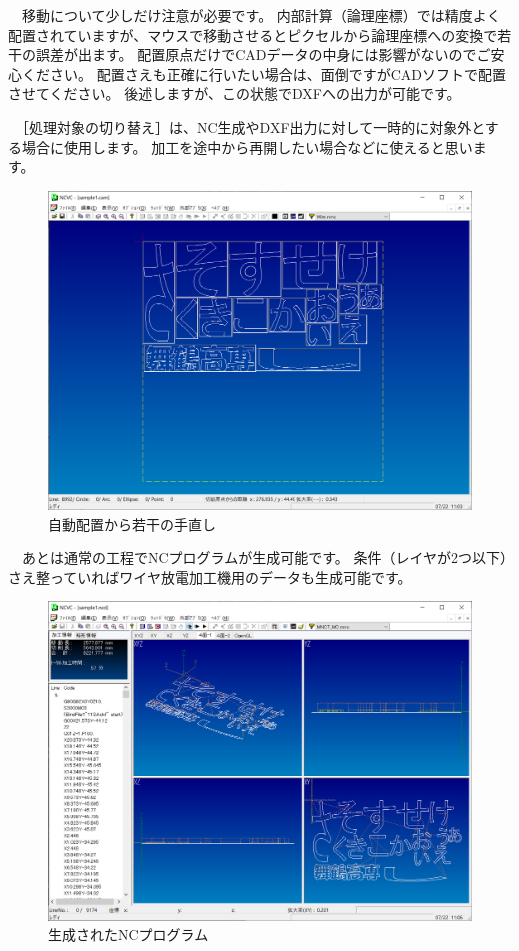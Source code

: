 　移動について少しだけ注意が必要です。
内部計算（論理座標）では精度よく配置されていますが、マウスで移動させるとピクセルから論理座標への変換で若干の誤差が出ます。
配置原点だけでCADデータの中身には影響がないのでご安心ください。
配置さえも正確に行いたい場合は、面倒ですがCADソフトで配置させてください。
後述しますが、この状態でDXFへの出力が可能です。

　［処理対象の切り替え］は、NC生成やDXF出力に対して一時的に対象外とする場合に使用します。
加工を途中から再開したい場合などに使えると思います。

\begin{figure}[H]
\centering
\includegraphics[scale=0.5]{No1/fig/sample2.png}
\caption{自動配置から若干の手直し}
\label{fig:sample2.png}
\end{figure}

　あとは通常の工程でNCプログラムが生成可能です。
条件（レイヤが2つ以下）さえ整っていればワイヤ放電加工機用のデータも生成可能です。

\begin{figure}[H]
\centering
\includegraphics[scale=0.5]{No1/fig/simu1.png}
\caption{生成されたNCプログラム}
\label{fig:simu1.png}
\end{figure}

